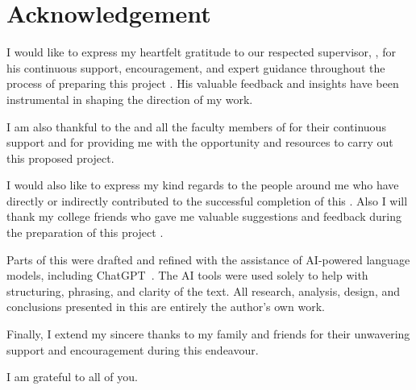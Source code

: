 \chapter*{Acknowledgement}

I would like to express my heartfelt gratitude to our respected supervisor, 
\Supervisor{}\unskip, for his continuous support, encouragement, and expert guidance throughout
the process of preparing this project \MakeLowercase\DocumentType{}. His valuable feedback and insights have been 
instrumental in shaping the direction of my work.

I am also thankful to the \Department{} and all the faculty members of \College{} for their
continuous support and for providing me with the opportunity and resources to carry out this
proposed project.

I would also like to express my kind regards to the people around me who have directly or
indirectly contributed to the successful completion of this \MakeLowercase\DocumentType{}. Also I will thank my
college friends who gave me valuable suggestions and feedback during the preparation of this
project \MakeLowercase\DocumentType{}.

Parts of this \MakeLowercase\DocumentType{} were drafted and refined with the assistance of AI-powered language models,
including ChatGPT~\cite{chatgpt2025}. The AI tools were used solely to help with structuring, 
phrasing, and clarity of the text. All research, analysis, design, and conclusions presented 
in this \MakeLowercase\DocumentType{} are entirely the author's own work.

Finally, I extend my sincere thanks to my family and friends for their unwavering support
and encouragement during this endeavour.

\vspace{4cm}
\begin{center}
    I am grateful to all of you. \\[0.5cm]

    \Authors{}
\end{center}